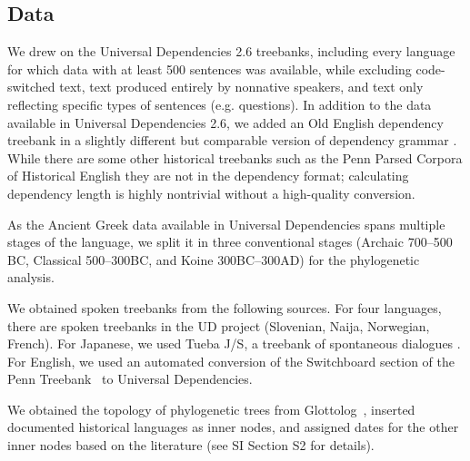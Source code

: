 \documentclass[9pt,twocolumn,twoside,lineno]{pnas-new}
\begin{document}
{%





\subsection*{Data}
We drew on the Universal Dependencies 2.6 treebanks, including every language for which data with at least 500 sentences was available, while excluding code-switched text, text produced entirely by nonnative speakers, and text only reflecting specific types of sentences (e.g. questions).
In addition to the data available in Universal Dependencies 2.6, we added an Old English dependency treebank in a slightly different but comparable version of dependency grammar \citep{bech2014iswoc}.
While there are some other historical treebanks such as the Penn Parsed Corpora of Historical English \citep{kroch2011penn} they are not in the dependency format; calculating dependency length is highly nontrivial without a high-quality conversion.

As the Ancient Greek data available in Universal Dependencies spans multiple stages of the language, we split it in three conventional stages (Archaic 700--500 BC, Classical 500--300BC, and Koine 300BC--300AD) for the phylogenetic analysis. 


We obtained spoken treebanks from the following sources.
For four languages, there are spoken treebanks in the UD project (Slovenian, Naija, Norwegian, French). For Japanese, we used Tueba J/S, a treebank of spontaneous dialogues \citep{hall2006conll}. For English, we used an automated conversion \citep{schuster2018sentences} of the Switchboard section of the Penn Treebank~\citep{marcus-building-1993} to Universal Dependencies.

We obtained the topology of phylogenetic trees from Glottolog~\citep{nordhoff2011glottolog}, inserted documented historical languages as inner nodes, and assigned dates for the other inner nodes based on the literature (see SI Section S2 for details).




}
\end{document}
